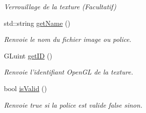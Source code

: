 \begin{DoxyCompactItemize}
\begin{DoxyCompactList}\small\item\em Verrouillage de la texture (Facultatif) \end{DoxyCompactList}\item 
\hypertarget{classTexture_a29d25e904c47cc08b5420c0cd5474743}{std\-::string \hyperlink{classTexture_a29d25e904c47cc08b5420c0cd5474743}{get\-Name} ()}\label{classTexture_a29d25e904c47cc08b5420c0cd5474743}

\begin{DoxyCompactList}\small\item\em Renvoie le nom du fichier image ou police. \end{DoxyCompactList}\item 
\hypertarget{classTexture_aab4bc3a5783b23881209c15223f2621e}{G\-Luint \hyperlink{classTexture_aab4bc3a5783b23881209c15223f2621e}{get\-I\-D} ()}\label{classTexture_aab4bc3a5783b23881209c15223f2621e}

\begin{DoxyCompactList}\small\item\em Renvoie l'identifiant Open\-G\-L de la texture. \end{DoxyCompactList}\item 
\hypertarget{classTexture_ac6f04a129a2c8ac1e22c7990866849db}{bool \hyperlink{classTexture_ac6f04a129a2c8ac1e22c7990866849db}{is\-Valid} ()}\label{classTexture_ac6f04a129a2c8ac1e22c7990866849db}

\begin{DoxyCompactList}\small\item\em Renvoie true si la police est valide false sinon. \end{DoxyCompactList}\end{DoxyCompactItemize}
